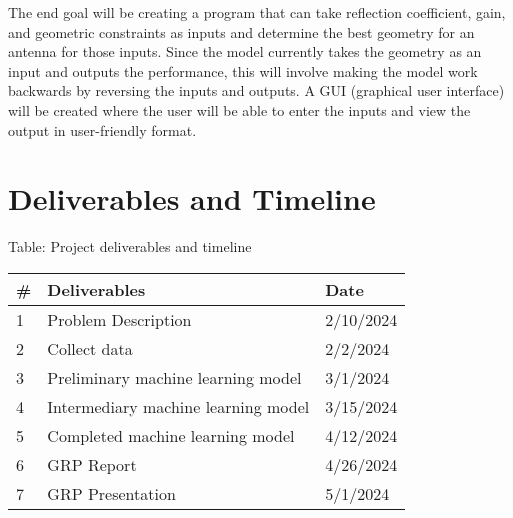 \documentclass[12pt, letterpaper, notitlepage]{article}
\begin{document}
The end goal will be creating a program that can take reflection coefficient, gain, and geometric constraints as inputs and determine the best geometry for an antenna for those inputs. Since the model currently takes the geometry as an input and outputs the performance, this will involve making the model work backwards by reversing the inputs and outputs. A GUI (graphical user interface) will be created where the user will be able to enter the inputs and view the output in user-friendly format. 

\section*{Deliverables and Timeline}
\begin{center}
\centering
Table: Project deliverables and timeline\\
\noindent\begin{tabular}{|l|l|l|} \hline
  \rowcolor{lightgray}\textbf{\#} & \textbf{Deliverables} & \textbf{Date} \\ \hline
  1 & Problem Description & 2/10/2024\\ \hline
  2 & Collect data & 2/2/2024\\ \hline
  3 & Preliminary machine learning model & 3/1/2024\\ \hline
  4 & Intermediary machine learning model & 3/15/2024\\ \hline
  5 & Completed machine learning model & 4/12/2024\\ \hline
  6 & GRP Report & 4/26/2024\\ \hline
  7 & GRP Presentation & 5/1/2024\\ \hline
\end{tabular}
\end{center}
\hspace{1em}



\end{document}
